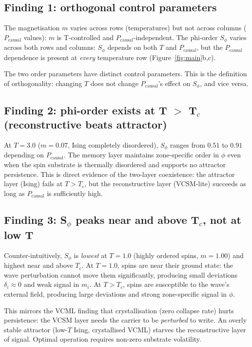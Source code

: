 \documentclass[11pt,a4paper]{article}
\begin{document}
\subsection{Finding 1: orthogonal control parameters}

The magnetisation $m$ varies across rows (temperatures) but not across columns
($P_\mathrm{causal}$ values): $m$ is T-controlled and $P_\mathrm{causal}$-independent.
The phi-order $S_\phi$ varies across both rows and columns: $S_\phi$ depends
on both $T$ and $P_\mathrm{causal}$, but the $P_\mathrm{causal}$ dependence is
present at \emph{every} temperature row (Figure~\ref{fig:main}b,c).

The two order parameters have distinct control parameters.
This is the definition of orthogonality: changing $T$ does not change
$P_\mathrm{causal}$'s effect on $S_\phi$, and vice versa.

\subsection{Finding 2: phi-order exists at T $>$ T$_c$ (reconstructive beats attractor)}

At $T=3.0$ ($m=0.07$, Ising completely disordered), $S_\phi$ ranges from
$0.51$ to $0.91$ depending on $P_\mathrm{causal}$.
The memory layer maintains zone-specific order in $\phi$ even when the
spin substrate is thermally disordered and supports no attractor persistence.
This is direct evidence of the two-layer coexistence:
the attractor layer (Ising) fails at $T > T_c$, but the reconstructive layer
(VCSM-lite) succeeds as long as $P_\mathrm{causal}$ is sufficiently high.

\subsection{Finding 3: S$_\phi$ peaks near and above T$_c$, not at low T}

Counter-intuitively, $S_\phi$ is \emph{lowest} at $T=1.0$ (highly ordered spins,
$m=1.00$) and highest near and above $T_c$.
At $T=1.0$, spins are near their ground state: the wave perturbation cannot
move them significantly, producing small deviations $\delta_i \approx 0$ and weak
signal in $m_i$.
At $T > T_c$, spins are susceptible to the wave's external field, producing large
deviations and strong zone-specific signal in $\phi$.

This mirrors the VCML finding that crystallisation (zero collapse rate) hurts
persistence: the VCSM layer needs the carrier to be \emph{perturbed} to write.
An overly stable attractor (low-$T$ Ising, crystallised VCML) starves the
reconstructive layer of signal.
Optimal operation requires non-zero substrate volatility.
\end{document}
